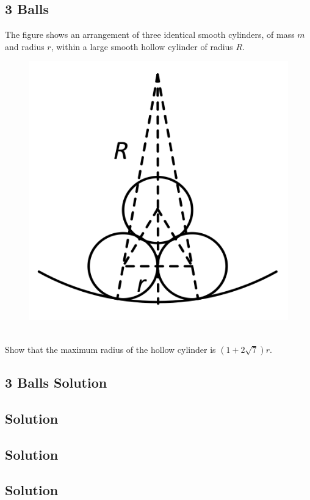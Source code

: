 \documentclass{article}
\begin{document}
\subsection{3 Balls }
The figure shows an arrangement of three identical smooth cylinders, of mass $m$ and radius $r$, within a large smooth hollow cylinder of radius $R$.
\begin{figure}[h]
    \centering
\includegraphics[width=0.5\linewidth]{images/3balls.png}
\end{figure}\\
Show that the maximum radius of the hollow cylinder is $(1+2 \sqrt{7}) r$.
\clearpage
\subsection{3 Balls Solution}
\clearpage
\subsection{}
\clearpage
\subsection{Solution}
\clearpage
\subsection{}
\clearpage
\subsection{Solution}
\clearpage
\subsection{}
\clearpage
\subsection{Solution}
\clearpage
\end{document}
